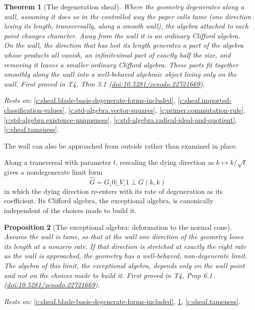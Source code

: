 \documentclass[11pt]{article}
\newtheorem{theorem}{Theorem}[section]
\newtheorem{proposition}[theorem]{Proposition}
\theoremstyle{definition}
\theoremstyle{plain}
\begin{document}
\begin{theorem}[The degeneration sheaf]\label{c:sheaf.degeneration-sheaf}
Where the geometry degenerates along a wall, assuming it does so in the controlled way the paper calls tame (one direction losing its length, transversally, along a smooth wall), the algebra attached to each point changes character. Away from the wall it is an ordinary Clifford algebra. On the wall, the direction that has lost its length generates a part of the algebra whose products all vanish, an infinitesimal part of exactly half the size, and removing it leaves a smaller ordinary Clifford algebra. These parts fit together smoothly along the wall into a well-behaved algebraic object living only on the wall.
\emph{First proved in} T4, Thm 3.1 (\href{https://doi.org/10.5281/zenodo.22721669}{doi:10.5281/zenodo.22721669}).
\end{theorem}
\noindent\emph{Rests on:} \ref{c:sheaf.blade-basis-degenerate-forms-included}, \ref{c:sheaf.imported-classification-values}, \ref{c:std-algebra.vector-squares}, \ref{c:primer.commutation-rule}, \ref{c:std-algebra.existence-uniqueness}, \ref{c:std-algebra.radical-ideal-and-quotient}, \ref{c:sheaf.tameness}.

The wall can also be approached from outside rather than examined in place.

Along a transversal with parameter $t$, rescaling the dying direction as $k \mapsto k/\sqrt{t}$ gives a nondegenerate limit form \[ \hat G = G\_0|\_{V\_1} \perp \dot G(k,k) \] in which the dying direction re-enters with its rate of degeneration as its coefficient. Its Clifford algebra, the exceptional algebra, is canonically independent of the choices made to build it.

\begin{proposition}[The exceptional algebra: deformation to the normal cone]\label{c:sheaf.exceptional-algebra-deformation-normal-cone}
Assume the wall is tame, so that at the wall one direction of the geometry loses its length at a nonzero rate. If that direction is stretched at exactly the right rate as the wall is approached, the geometry has a well-behaved, non-degenerate limit. The algebra of this limit, the exceptional algebra, depends only on the wall point and not on the choices made to build it.
\emph{First proved in} T4, Prop 6.1 (\href{https://doi.org/10.5281/zenodo.22721669}{doi:10.5281/zenodo.22721669}).
\end{proposition}
\noindent\emph{Rests on:} \ref{c:sheaf.blade-basis-degenerate-forms-included}, \ref{c:sheaf.degeneration-sheaf}, \ref{c:sheaf.tameness}.
\end{document}
